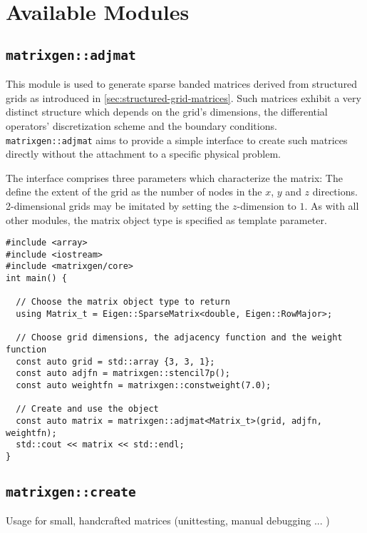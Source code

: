 \chapter{Available Modules}

  \section{\texttt{matrixgen::adjmat}}

    This module is used to generate sparse banded matrices derived from structured grids as introduced in
    \ref{sec:structured-grid-matrices}. Such matrices exhibit a very distinct structure which depends on the grid's
    dimensions, the differential operators' discretization scheme and the boundary conditions.
    \texttt{matrixgen::adjmat} aims to provide a simple interface to create such matrices directly without the
    attachment to a specific physical problem.

    The interface comprises three parameters which characterize the matrix: The  define the extent
    of the grid as the number of nodes in the $x$, $y$ and $z$ directions. 2-dimensional grids may be imitated by
    setting the $z$-dimension to $1$. As with all other modules, the matrix object type is specified as template
    parameter.

    \begin{verbatim}
#include <array>
#include <iostream>
#include <matrixgen/core>
int main() {

  // Choose the matrix object type to return
  using Matrix_t = Eigen::SparseMatrix<double, Eigen::RowMajor>;

  // Choose grid dimensions, the adjacency function and the weight function
  const auto grid = std::array {3, 3, 1};
  const auto adjfn = matrixgen::stencil7p();
  const auto weightfn = matrixgen::constweight(7.0);

  // Create and use the object
  const auto matrix = matrixgen::adjmat<Matrix_t>(grid, adjfn, weightfn);
  std::cout << matrix << std::endl;
}
    \end{verbatim}


  \section{\texttt{matrixgen::create}}

    Usage for small, handcrafted matrices (unittesting, manual debugging ... )

